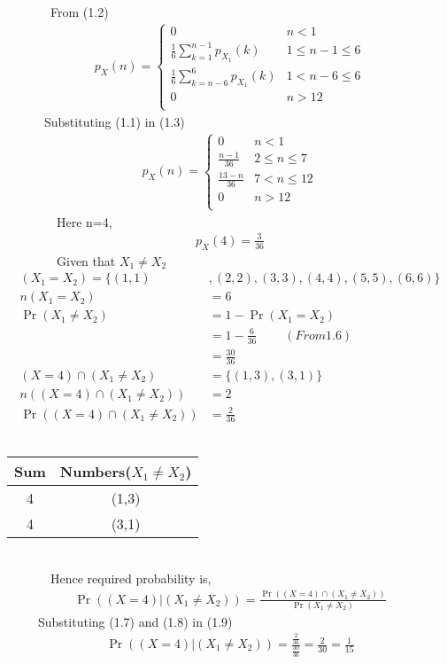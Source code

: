 \documentclass[journal,12pt,twocolumn]{IEEEtran}
\providecommand{\pr}[1]{\ensuremath{\Pr\left(#1\right)}}
\theoremstyle{remark}
\begin{document}
\ \ \ \ \ \ \ From (1.2)
\begin{align*}
  p_X(n) =
  \begin{cases}
  0 & n < 1 \\
  \frac{1}{6}\sum_{k=1}^{n-1}p_{X_1}(k) & 1 \leq n-1 \leq 6 \\
  \frac{1}{6}\sum_{k=n-6}^{6}p_{X_1}(k) & 1 < n-6 \leq 6 \\
  0 & n > 12 \\
  \end{cases}
  \tag{1.3}
  \end{align*}
  \ \ \ \ \ \ Substituting (1.1) in (1.3)
  \begin{align*}
  p_X(n) =
  \begin{cases}
  0 & n < 1 \\
  \frac{n-1}{36} & 2 \leq n \leq 7 \\
  \frac{13-n}{36} & 7 < n \leq 12 \\
  0 & n > 12 \\
  \end{cases}
  \tag{1.4}
  \end{align*}
  \ \ \ \ \ \ \ \ Here n=4,
  \begin{align*}
  p_X(4)=\frac{3}{36} \tag{1.5}
  \end{align*}
  \ \ \ \ \ \ \ \ Given that $ X_1 \neq X_2 $
\begin{align*}
  (X_1=X_2)=\{(1,1)&,(2,2),(3,3),(4,4),(5,5),(6,6)\} \\
  n(X_1=X_2)&=6 \tag{1.6} \\
\pr{X_1 \neq X_2}&=1-\pr{X_1=X_2} \\
&=1-\frac{6}{36} \ \ \ \ \ \ \ \ \ \ (From 1.6) \\
&=\frac{30}{36} \tag{1.7} \\
{(X=4)} \cap (X_1 \neq X_2)&=\{(1,3),(3,1)\} \\
n({(X=4)} \cap (X_1 \neq X_2))&=2 \\ 
\pr{(X=4) \cap (X_1 \neq X_2)}&=\frac{2}{36} \tag{1.8}
\end{align*}
\ \ \ \ \ \ \ \ \ \begin{tabular}{|c|c|}
  \hline
  Sum & Numbers($X_1 \neq X_2 $)  \\
  \hline
  4 & (1,3)  \\
  \hline
  4 & (3,1) \\
  \hline
\end{tabular} \\

\ \ \ \ \ \ \ Hence required probability is,
\begin{align*}
\pr{(X=4)|(X_1 \neq X_2)}=\frac{\pr{(X=4) \cap (X_1 \neq X_2)}}{\pr{X_1 \neq X_2}}\tag{1.9}
\end{align*}
\ \ \ \ \ Substituting (1.7) and (1.8) in (1.9) 
\begin{align*}
\pr{(X=4)|(X_1 \neq X_2)}=\frac{\frac{2}{36}}{\frac{30}{36}}=\frac{2}{30}=\frac{1}{15}
\end{align*}
\end{document}
